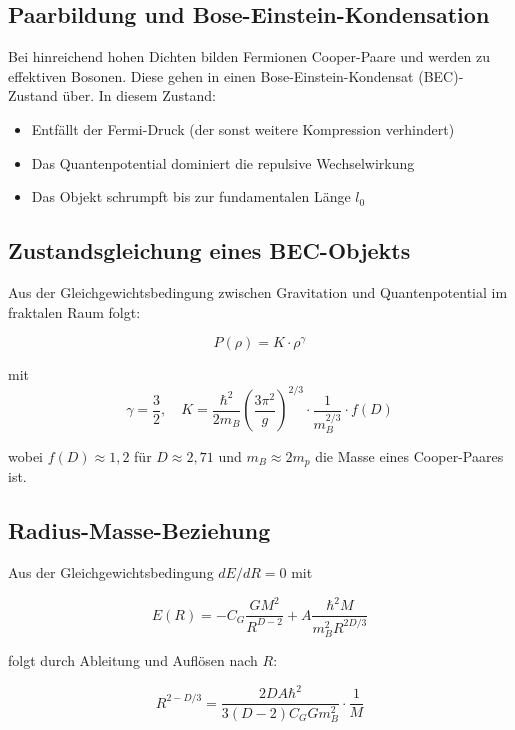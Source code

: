 \documentclass[12pt,a4paper]{article}
\begin{document}
\subsection{Paarbildung und Bose-Einstein-Kondensation}

Bei hinreichend hohen Dichten bilden Fermionen Cooper-Paare und werden zu effektiven Bosonen. Diese gehen in einen Bose-Einstein-Kondensat (BEC)-Zustand über. In diesem Zustand:
\begin{itemize}
\item Entfällt der Fermi-Druck (der sonst weitere Kompression verhindert)
\item Das Quantenpotential dominiert die repulsive Wechselwirkung
\item Das Objekt schrumpft bis zur fundamentalen Länge $l_0$
\end{itemize}

\subsection{Zustandsgleichung eines BEC-Objekts}

Aus der Gleichgewichtsbedingung zwischen Gravitation und Quantenpotential im fraktalen Raum folgt:

\begin{equation}
P(\rho) = K \cdot \rho^{\gamma}
\end{equation}

mit
\begin{equation}
\gamma = \frac{3}{2}, \quad K = \frac{\hbar^2}{2m_B} \left( \frac{3\pi^2}{g} \right)^{2/3} \cdot \frac{1}{m_B^{2/3}} \cdot f(D)
\end{equation}

wobei $f(D) \approx 1,2$ für $D \approx 2,71$ und $m_B \approx 2m_p$ die Masse eines Cooper-Paares ist.

\subsection{Radius-Masse-Beziehung}

Aus der Gleichgewichtsbedingung $dE/dR = 0$ mit

\begin{equation}
E(R) = -C_G \frac{GM^2}{R^{D-2}} + A \frac{\hbar^2 M}{m_B^2 R^{2D/3}}
\end{equation}

folgt durch Ableitung und Auflösen nach $R$:

\begin{equation}
R^{2-D/3} = \frac{2DA\hbar^2}{3(D-2)C_G Gm_B^2} \cdot \frac{1}{M}
\end{equation}
\end{document}
